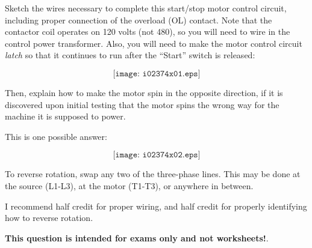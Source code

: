 

Sketch the wires necessary to complete this start/stop motor control circuit, including proper connection of the overload (OL) contact.  Note that the contactor coil operates on 120 volts (not 480), so you will need to wire in the control power transformer.  Also, you will need to make the motor control circuit {\it latch} so that it continues to run after the ``Start'' switch is released:

$$\texttt{[image: i02374x01.eps]}$$

Then, explain how to make the motor spin in the opposite direction, if it is discovered upon initial testing that the motor spins the wrong way for the machine it is supposed to power.







This is one possible answer:

$$\texttt{[image: i02374x02.eps]}$$

\vskip 10pt

To reverse rotation, swap any two of the three-phase lines.  This may be done at the source (L1-L3), at the motor (T1-T3), or anywhere in between.

\vskip 10pt

I recommend half credit for proper wiring, and half credit for properly identifying how to reverse rotation.







{\bf This question is intended for exams only and not worksheets!}.


